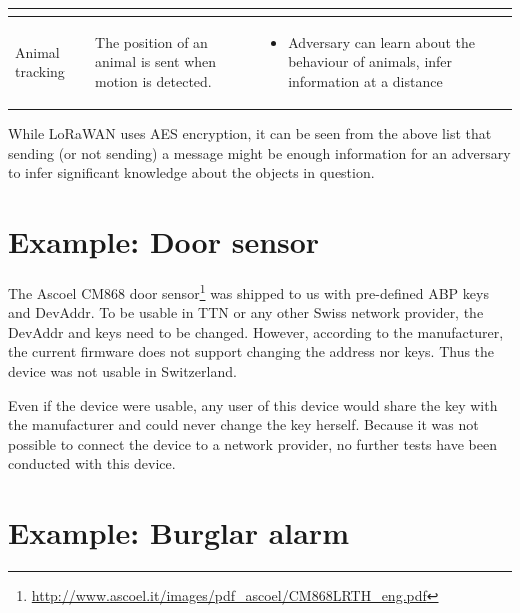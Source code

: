 {\begin{longtable}[c]{|l|l|l|}
\begin{minipage}[t]{0.40\columnwidth}
\begin{itemize}
\end{itemize}
\strut\end{minipage}\tabularnewline
\hline
\begin{minipage}[t]{0.20\columnwidth}\raggedright\strut
{Animal tracking}
\strut\end{minipage} &
\begin{minipage}[t]{0.30\columnwidth}\raggedright\strut
{The position of an animal is sent when motion is detected.}
\strut\end{minipage} &
\begin{minipage}[t]{0.40\columnwidth}\raggedright\strut
\begin{itemize}
\tightlist
\item
  {Adversary can learn about the behaviour of animals, infer information
  at a distance}
\end{itemize}
\strut\end{minipage}\tabularnewline
\hline
\end{longtable}

{While LoRaWAN uses AES encryption, it can be seen from the above list
that sending (or not sending) a message might be enough information for
an adversary to infer significant knowledge about the objects in
question.}
\section{\texorpdfstring{{Example: Door
sensor}}{Example: Door sensor}}\label{h.bju94okea6h3}

The Ascoel CM868 door
sensor\footnote{\url{http://www.ascoel.it/images/pdf_ascoel/CM868LRTH_eng.pdf}} was shipped
to us with pre-defined ABP keys and DevAddr. To be usable in TTN or any
other Swiss network provider, the DevAddr and keys need to be changed.
However, according to the manufacturer, the current firmware does not
support changing the address nor keys. Thus the device was not usable in Switzerland.

Even if the device were
usable, any user of this device would share the key with the
manufacturer and could never change the key herself.
Because it was not possible to connect the device to a network provider, no further tests have
been conducted with this device.

\section{Example: Burglar alarm}
\label{sec.burglar}

}
